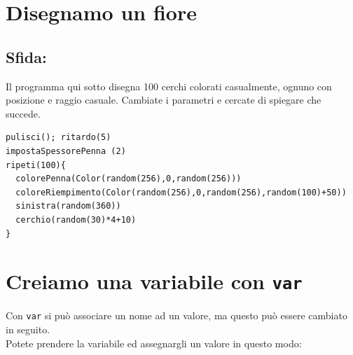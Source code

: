 \chapter{Disegnamo un fiore}\section*{\color{BrickRed}Sfida:}
Il programma qui sotto disegna 100 cerchi colorati casualmente, ognuno con posizione e raggio casuale. Cambiate i parametri e cercate di spiegare che succede.

  

\begin{lstlisting}[basicstyle={\ttfamily\fontsize{16}{19}\selectfont},numbers=none]
pulisci(); ritardo(5)
impostaSpessorePenna (2)
ripeti(100){
  colorePenna(Color(random(256),0,random(256)))
  coloreRiempimento(Color(random(256),0,random(256),random(100)+50))
  sinistra(random(360))
  cerchio(random(30)*4+10)
}
\end{lstlisting}
        
\chapter{Creiamo una variabile con \lstinline{var}}Con \lstinline{var} si può associare un nome ad un valore, ma questo può essere cambiato in seguito.\\
Potete prendere la variabile ed assegnargli un valore in questo modo:

